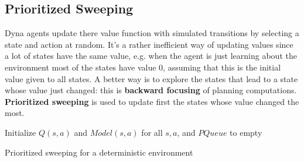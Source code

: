 \documentclass[11pt]{article}
\begin{document}
\subsection{Prioritized Sweeping}
\label{sec:org0d3ca8b}

Dyna agents update there value function with simulated transitions by selecting
a state and action at random. It's a rather inefficient way of updating values
since a lot of states have the same value, e.g. when the agent is just learning
about the environment most of the states have value 0, assuming that this is the
initial value given to all states. A better way is to explore the states that
lead to a state whose value just changed: this is \textbf{backward focusing} of
planning computations. \textbf{Prioritized sweeping} is used to update first the states
whose value changed the most.

\begin{algorithm}[H]
Initialize $Q(s,a)$ and $Model(s,a)$ for all $s,a$, and $PQueue$ to empty\\
\caption{Prioritized sweeping for a deterministic environment}
\end{algorithm}
\end{document}
